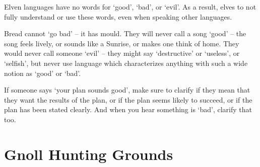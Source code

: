 \begin{multicols}{2}
Elven languages have no words for `good', `bad', or `evil'.
As a result, elves to not fully understand or use these words, even when speaking other languages.

Bread cannot `go bad' -- it has mould.
They will never call a song `good' -- the song feels lively, or sounds like a Sunrise, or makes one think of home.
They would never call someone `evil' -- they might say `destructive' or `useless', or `selfish', but never use language which characterizes anything with such a wide notion as `good' or `bad'.

If someone says `your plan sounds good', make sure to clarify if they mean that they want the results of the plan, or if the plan seems likely to succeed, or if the plan has been stated clearly.
And when you hear something is `bad', clarify that too.

\end{multicols}

\section[Gnolls]{Gnoll Hunting Grounds \Nl}
\label{GnollishGrounds}

